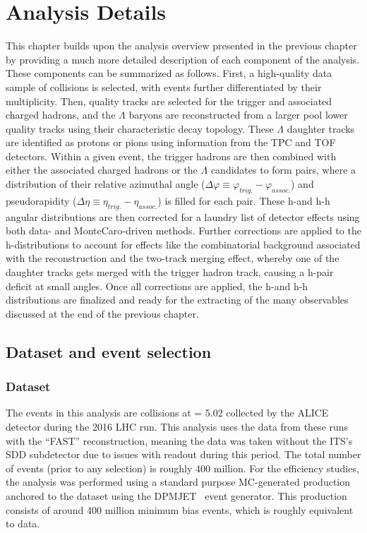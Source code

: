 \chapter{Analysis Details}
\label{ch:analysis_details}

This chapter builds upon the analysis overview presented in the previous chapter by providing a much more detailed description of each component of the analysis. These components can be summarized as follows. First, a high-quality data sample of \pPb collisions is selected, with events further differentiated by their multiplicity. Then, quality tracks are selected for the trigger and associated charged hadrons, and the $\Lambda$ baryons are reconstructed from a larger pool lower quality tracks using their characteristic decay topology. These $\Lambda$ daughter tracks are identified as protons or pions using information from the TPC and TOF detectors. Within a given event, the trigger hadrons are then combined with either the associated charged hadrons or the $\Lambda$ candidates to form pairs, where a distribution of their relative azimuthal angle ($\Delta\varphi \equiv \varphi_{trig.} - \varphi_{assoc.}$) and pseudorapidity ($\Delta\eta \equiv \eta_{trig.} - \eta_{assoc.}$) is filled for each pair. These h-\lmb and h-h angular distributions are then corrected for a laundry list of detector effects using both data- and MonteCaro-driven methods. Further corrections are applied to the h-\lmb distributions to account for effects like the combinatorial background associated with the \lmb reconstruction and the two-track merging effect, whereby one of the daughter tracks gets merged with the trigger hadron track, causing a h-\lmb pair deficit at small angles. Once all corrections are applied, the h-\lmb and h-h distributions are finalized and ready for the extracting of the many observables discussed at the end of the previous chapter.

\section{Dataset and event selection}
\label{sec:event_selection}

\subsection{Dataset}

The events in this analysis are \pPb collisions at \snn = 5.02 \TeV collected by the ALICE detector during the 2016 LHC run. This analysis uses the data from these runs with the ``FAST'' reconstruction, meaning the data was taken without the ITS's SDD subdetector due to issues with readout during this period. The total number of events (prior to any selection) is roughly 400 million. For the efficiency studies, the analysis was performed using a standard purpose MC-generated production anchored to the dataset using the DPMJET~\cite{DPMJET} event generator. This production consists of around 400 million minimum bias events, which is roughly equivalent to data.

